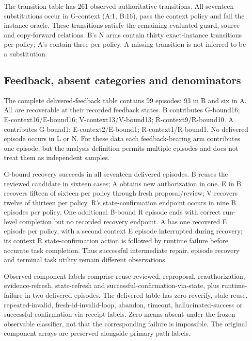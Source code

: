\documentclass[11pt,a4paper]{article}
\begin{document}
The transition table has 261 observed authoritative transitions. All seventeen substitutions occur in G-context (A:1, B:16), pass the context policy and fail the instance oracle. These transitions satisfy the remaining evaluated guard, source and copy-forward relations. B's N arms contain thirty exact-instance transitions per policy; A's contain three per policy. A missing transition is not inferred to be a substitution.

\subsection{Feedback, absent categories and denominators}
The complete delivered-feedback table contains 99 episodes: 93 in B and six in A. All are recoverable at their recorded feedback states. B contributes G-bound16; E-context16/E-bound16; V-context13/V-bound13; R-context9/R-bound10. A contributes G-bound1; E-context2/E-bound1; R-context1/R-bound1. No delivered episode occurs in L or N. For these data each feedback-bearing arm contributes one episode, but the analysis definition permits multiple episodes and does not treat them as independent samples.

G-bound recovery succeeds in all seventeen delivered episodes. B reuses the reviewed candidate in sixteen cases; A obtains new authorization in one. E in B recovers fifteen of sixteen per policy through fresh proposal/review; V recovers twelve of thirteen per policy. R's state-confirmation endpoint occurs in nine B episodes per policy. One additional B-bound R episode ends with correct run-level completion but no recorded recovery endpoint. A has one recovered E episode per policy, with a second context E episode interrupted during recovery; its context R state-confirmation action is followed by runtime failure before accurate task completion. Thus successful intermediate repair, episode recovery and terminal task utility remain different observations.

Observed component labels comprise reuse-reviewed, reproposal, reauthorization, evidence-refresh, state-refresh and successful-confirmation-via-state, plus runtime-failure in two delivered episodes. The delivered table has zero reverify, stale-reuse, repeated-invalid, fresh-id-invalid-loop, abandon, timeout, hallucinated-success or successful-confirmation-via-receipt labels. Zero means absent under the frozen observable classifier, not that the corresponding failure is impossible. The original component arrays are preserved alongside primary path labels.
\end{document}
